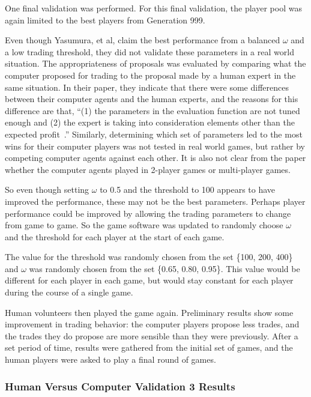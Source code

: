 One final validation was performed. For this final validation, the player pool
was again limited to the best players from Generation 999.

Even though Yasumura, et al, claim the best performance from a balanced
\(\omega\) and a low trading threshold, they did not validate these parameters
in a real world situation. The appropriateness of proposals was evaluated by
comparing what the computer proposed for trading to the proposal made by a human
expert in the same situation. In their paper, they indicate that there were some
differences between their computer agents and the human experts, and the reasons
for this difference are that, ``(1) the parameters in the evaluation function
are not tuned enough and (2) the expert is taking into consideration elements
other than the expected profit~\cite{Yasumura2001Negotiate}.'' Similarly,
determining which set of parameters led to the most wins for their computer
players was not tested in real world games, but rather by competing computer
agents against each other. It is also not clear from the paper whether the
computer agents played in 2-player games or multi-player games.

So even though setting \(\omega\) to 0.5 and the threshold to 100 appears to
have improved the performance, these may not be the best parameters. Perhaps
player performance could be improved by allowing the trading parameters to
change from game to game. So the game software was updated to randomly choose
\(\omega\) and the threshold for each player at the start of each game.

The value for the threshold was randomly chosen from the set \{100, 200,
400\} and \(\omega\) was randomly chosen from the set \{0.65, 0.80, 0.95\}. This
value would be different for each player in each game, but would stay constant
for each player during the course of a single game. 

Human volunteers then played the game again. Preliminary results show some
improvement in trading behavior: the computer players propose less trades, and
the trades they do propose are more sensible than they were previously. After a
set period of time, results were gathered from the initial set of games, and the
human players were asked to play a final round of games.

\subsubsection{Human Versus Computer Validation 3 Results}

